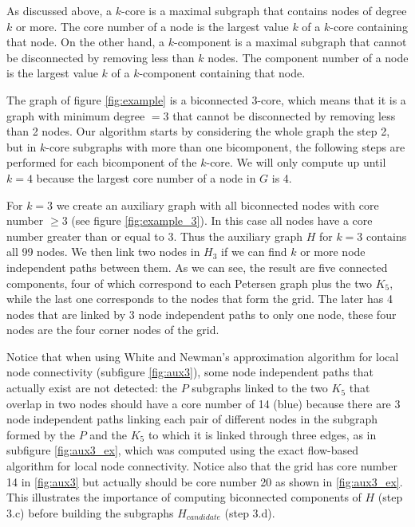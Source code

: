 As discussed above, a $k$-core is a maximal subgraph that contains nodes of degree $k$ or more. The core number of a node is the largest value $k$ of a $k$-core containing that node. On the other hand, a $k$-component is a maximal subgraph that cannot be disconnected by removing less than $k$ nodes. The component number of a node is the largest value $k$ of a $k$-component containing that node.

The graph of figure \ref{fig:example} is a biconnected 3-core, which means that it is a graph with minimum degree $=3$ that cannot be disconnected by removing less than 2 nodes. Our algorithm starts by considering the whole graph the step 2, but in $k$-core subgraphs with more than one bicomponent, the following steps are performed for each bicomponent of the $k$-core. We will only compute up until $k=4$ because the largest core number of a node in $G$ is 4. 

For $k=3$ we create an auxiliary graph with all biconnected nodes with core number $\ge 3$ (see figure \ref{fig:example_3}). In this case all nodes have a core number greater than or equal to 3. Thus the auxiliary graph $H$ for $k=3$ contains all 99 nodes. We then link two nodes in $H_3$ if we can find $k$ or more node independent paths between them. As we can see, the result are five connected components, four of which correspond to each Petersen graph plus the two $K_5$, while the last one corresponds to the nodes that form the grid. The later has 4 nodes that are linked by 3 node independent paths to only one node, these four nodes are the four corner nodes of the grid. 

Notice that when using White and Newman's approximation algorithm for local node connectivity (subfigure \ref{fig:aux3}), some node independent paths that actually exist are not detected: the $P$ subgraphs linked to the two $K_5$ that overlap in two nodes should have a core number of 14 (blue) because there are 3 node independent paths linking each pair of different nodes in the subgraph formed by the $P$ and the $K_5$ to which it is linked through three edges, as in subfigure \ref{fig:aux3_ex}, which was computed using the exact flow-based algorithm for local node connectivity. Notice also that the grid has core number 14 in \ref{fig:aux3} but actually should be core number 20 as shown in \ref{fig:aux3_ex}. This illustrates the importance of computing biconnected components of $H$ (step 3.c) before building the subgraphs $H_{candidate}$ (step 3.d).

